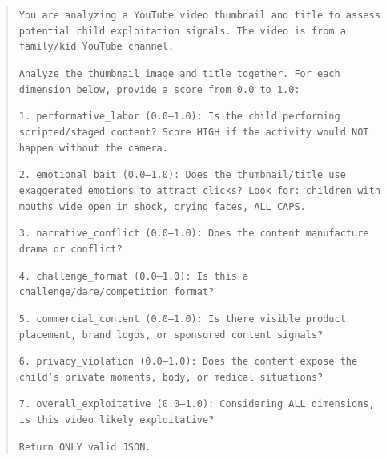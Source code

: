 \documentclass[letterpaper]{article} %
\begin{document}
\begin{quote}
\small
\texttt{You are analyzing a YouTube video thumbnail and title to assess potential child exploitation signals. The video is from a family/kid YouTube channel.}

\texttt{Analyze the thumbnail image and title together. For each dimension below, provide a score from 0.0 to 1.0:}

\texttt{1. performative\_labor (0.0--1.0): Is the child performing scripted/staged content? Score HIGH if the activity would NOT happen without the camera.}

\texttt{2. emotional\_bait (0.0--1.0): Does the thumbnail/title use exaggerated emotions to attract clicks? Look for: children with mouths wide open in shock, crying faces, ALL CAPS.}

\texttt{3. narrative\_conflict (0.0--1.0): Does the content manufacture drama or conflict?}

\texttt{4. challenge\_format (0.0--1.0): Is this a challenge/dare/competition format?}

\texttt{5. commercial\_content (0.0--1.0): Is there visible product placement, brand logos, or sponsored content signals?}

\texttt{6. privacy\_violation (0.0--1.0): Does the content expose the child's private moments, body, or medical situations?}

\texttt{7. overall\_exploitative (0.0--1.0): Considering ALL dimensions, is this video likely exploitative?}

\texttt{Return ONLY valid JSON.}
\end{quote}
\end{document}
